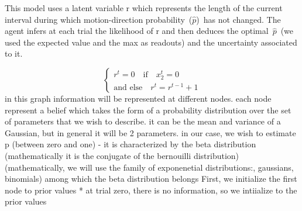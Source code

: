 \documentclass[profile,final,english, draft]{article}%
\newcommand{\choice}[1]{ %
	\left\{ %
		\begin{array}{l} #1 \end{array} %
	\right. }
\newcommand{\eql}[1]{\begin{equation}#1\end{equation}}
\begin{document}
This model uses a latent variable r which represents the length of the current interval during which motion-direction probability~($\hat{p}$)~has not changed. The agent infers at each trial the likelihood of r and then deduces the optimal~$\hat{p}$~(we used the expected value and the max as readouts) and the uncertainty associated to it.

\eql{\choice{
r^t = 0 \quad \text{if} \quad x_2^t=0 \\
\text{and else} \quad r^t = r^{t-1} +1 }\label{eq:run_length}}
 in this graph information will be represented at different nodes. each node represent a belief which takes the form of a probability distribution over the set of parameters that we wish to describe.
it can be the mean and variance of a Gaussian, but in general it will be 2 parameters. in our case, we wish to estimate p (between zero and one) - it is characterized by the beta distribution (mathematically it is the conjugate of the bernouilli distribution)
 (mathematically, we will use the family of exponenetial distributions:, gaussians, binomials) among which the beta distribution belongs
First, we initialize the first node to prior values
* at trial zero, there is no information, so we intiialize to the prior values
\end{document}
